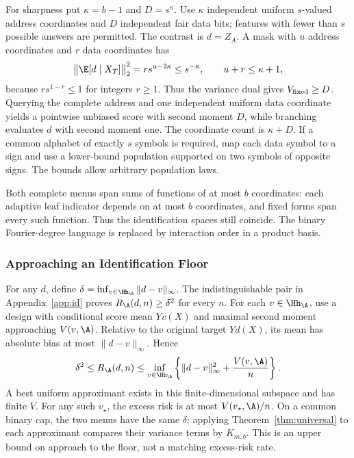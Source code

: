 For sharpness put $\kappa=b-1$ and $D=s^\kappa$. Use $\kappa$ independent uniform $s$-valued address coordinates and $D$ independent fair data bits; features with fewer than $s$ possible answers are permitted. The contrast is $d=Z_A$. A mask with $u$ address coordinates and $r$ data coordinates has
\[
 \big\|\E[d\mid X_T]\big\|_2^2=r s^{u-2\kappa}\le s^{-\kappa},\qquad u+r\le \kappa+1,
\]
because $r s^{1-r}\le1$ for integers $r\ge1$. Thus the variance dual gives $V_{\rm fixed}\ge D$. Querying the complete address and one independent uniform data coordinate yields a pointwise unbiased score with second moment $D$, while branching evaluates $d$ with second moment one. The coordinate count is $\kappa+D$. If a common alphabet of exactly $s$ symbols is required, map each data symbol to a sign and use a lower-bound population supported on two symbols of opposite signs. The bounds allow arbitrary population laws.

Both complete menus span sums of functions of at most $b$ coordinates: each adaptive leaf indicator depends on at most $b$ coordinates, and fixed forms span every such function. Thus the identification spaces still coincide. The binary Fourier-degree language is replaced by interaction order in a product basis.

\subsubsection{Approaching an Identification Floor}\label{app:floor-rate}
For any $d$, define $\delta=\inf_{v\in\Hh_\A}\|d-v\|_\infty$. The indistinguishable pair in Appendix~\ref{app:id} proves $R_\A(d,n)\ge\delta^2$ for every $n$. For each $v\in\Hh_\A$, use a design with conditional score mean $Yv(X)$ and maximal second moment approaching $V(v,\A)$. Relative to the original target $Yd(X)$, its mean has absolute bias at most $\|d-v\|_\infty$. Hence
\begin{equation}
 \delta^2\le R_\A(d,n)
 \le\inf_{v\in\Hh_\A}\left\{\|d-v\|_\infty^2+\frac{V(v,\A)}n\right\}.
 \label{eq:floor-envelope}
\end{equation}
A best uniform approximant exists in this finite-dimensional subspace and has finite $V$. For any such $v_\star$, the excess risk is at most $V(v_\star,\A)/n$. On a common binary cap, the two menus have the same $\delta$; applying Theorem~\ref{thm:universal} to each approximant compares their variance terms by $K_{m,b}$. This is an upper bound on approach to the floor, not a matching excess-risk rate.

